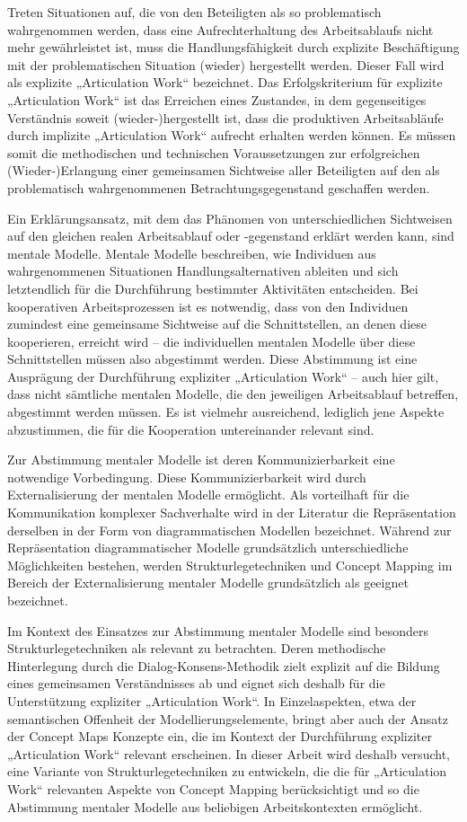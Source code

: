 Treten Situationen auf, die von den Beteiligten als so problematisch wahrgenommen werden, dass eine Aufrechterhaltung des Arbeitsablaufs nicht mehr gewährleistet ist, muss die Handlungsfähigkeit durch explizite Beschäftigung mit der problematischen Situation (wieder) hergestellt werden. Dieser Fall wird als explizite „Articulation Work“ bezeichnet. Das Erfolgskriterium für explizite „Articulation Work“ ist das Erreichen eines Zustandes, in dem gegenseitiges Verständnis soweit (wieder-)hergestellt ist, dass die produktiven Arbeitsabläufe durch implizite „Articulation Work“ aufrecht erhalten werden können. Es müssen somit die methodischen und technischen Voraussetzungen zur erfolgreichen (Wieder-)Erlangung einer gemeinsamen Sichtweise aller Beteiligten auf den als problematisch wahrgenommenen Betrachtungsgegenstand geschaffen werden.

Ein Erklärungsansatz, mit dem das Phänomen von unterschiedlichen Sichtweisen auf den gleichen realen Arbeitsablauf oder -gegenstand erklärt werden kann, sind mentale Modelle. Mentale Modelle beschreiben, wie Individuen aus wahrgenommenen Situationen Handlungsalternativen ableiten und sich letztendlich für die Durchführung bestimmter Aktivitäten entscheiden. Bei kooperativen Arbeitsprozessen ist es notwendig, dass von den Individuen zumindest eine gemeinsame Sichtweise auf die Schnittstellen, an denen diese kooperieren, erreicht wird -- die individuellen mentalen Modelle über diese Schnittstellen müssen also abgestimmt werden. Diese Abstimmung ist eine Ausprägung der Durchführung expliziter „Articulation Work“ -- auch hier gilt, dass nicht sämtliche mentalen Modelle, die den jeweiligen Arbeitsablauf betreffen, abgestimmt werden müssen. Es ist vielmehr ausreichend, lediglich jene Aspekte abzustimmen, die für die Kooperation untereinander relevant sind.

Zur Abstimmung mentaler Modelle ist deren Kommunizierbarkeit eine notwendige Vorbedingung. Diese Kommunizierbarkeit wird durch Externalisierung der mentalen Modelle ermöglicht. Als vorteilhaft für die Kommunikation komplexer Sachverhalte wird in der Literatur die Repräsentation derselben in der Form von diagrammatischen Modellen bezeichnet. Während zur Repräsentation diagrammatischer Modelle grundsätzlich unterschiedliche Möglichkeiten bestehen, werden Strukturlegetechniken und Concept Mapping im Bereich der Externalisierung mentaler Modelle grundsätzlich als geeignet bezeichnet. 

Im Kontext des Einsatzes zur Abstimmung mentaler Modelle sind besonders Strukturlegetechniken als relevant zu betrachten. Deren methodische Hinterlegung durch die Dialog-Konsens-Methodik zielt explizit auf die Bildung eines gemeinsamen Verständnisses ab und eignet sich deshalb für die Unterstützung expliziter „Articulation Work“. In Einzelaspekten, etwa der semantischen Offenheit der Modellierungselemente, bringt aber auch der Ansatz der Concept Maps Konzepte ein, die im Kontext der Durchführung expliziter „Articulation Work“ relevant erscheinen. In dieser Arbeit wird deshalb versucht, eine Variante von Strukturlegetechniken zu entwickeln, die die für „Articulation Work“ relevanten Aspekte von Concept Mapping berücksichtigt und so die Abstimmung mentaler Modelle aus beliebigen Arbeitskontexten ermöglicht. 

